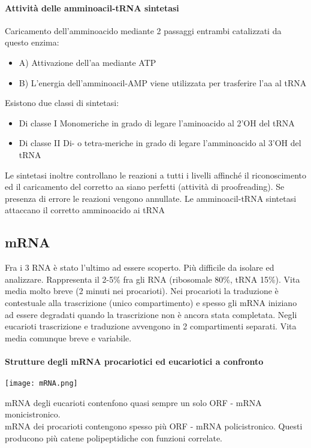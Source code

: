 \documentclass{article}
\begin{document}
\paragraph{Attività delle amminoacil-tRNA sintetasi}
Caricamento dell'amminoacido mediante 2 passaggi entrambi catalizzati da questo enzima:
\begin{itemize}
    \item{A)} Attivazione dell'aa mediante ATP
    \item{B)} L'energia dell'amminoacil-AMP viene utilizzata per trasferire l'aa al tRNA
\end{itemize}
Esistono due classi di sintetasi:
\begin{itemize}
    \item Di classe I
    \subitem Monomeriche in grado di legare l'aminoacido al 2'OH del tRNA
    \item Di classe II
    \subitem Di- o tetra-meriche in grado di legare l'amminoacido al 3'OH del tRNA
\end{itemize}
Le sintetasi inoltre controllano le reazioni a tutti i livelli affinché il
riconoscimento ed il caricamento del corretto aa siano perfetti
(attività di proofreading). Se presenza di errore le reazioni vengono annullate.
Le amminoacil-tRNA sintetasi attaccano il corretto amminoacido ai tRNA 
\subsection{mRNA}
Fra i 3 RNA è stato l'ultimo ad essere scoperto. Più difficile da isolare ed analizzare. Rappresenta il 2-5\% fra
gli RNA (ribosomale 80\%, tRNA 15\%). Vita media molto breve (2 minuti nei procarioti).
Nei procarioti la traduzione è contestuale alla trascrizione (unico compartimento) e spesso gli mRNA iniziano ad
essere degradati quando la trascrizione non è ancora stata completata. Negli eucarioti trascrizione e traduzione avvengono in 2 compartimenti separati. Vita media
comunque breve e variabile. 
\paragraph{Strutture degli mRNA procariotici ed eucariotici a confronto}
\begin{center}
    \texttt{[image: mRNA.png]}
\end{center}
mRNA degli eucarioti contenfono quasi sempre un solo ORF - mRNA monicistronico.\\
mRNA dei procarioti contengono spesso più ORF - mRNA policistronico. Questi producono più catene polipeptidiche con funzioni correlate.
\end{document}

